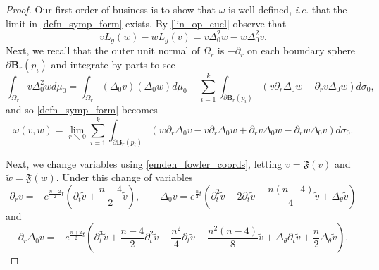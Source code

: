 \documentclass[reqno,11pt]{amsart}
\theoremstyle{tttheorem}
\newcommand{\B}{\mathbf{B}}
\begin{document}
\begin{proof} Our first order of business is to show that 
$\omega$ is well-defined, {\it i.e.} that the limit in \eqref{defn_symp_form}
exists. By \eqref{lin_op_eucl} observe that 
$$vL_g(w) - wL_g(v) = v \Delta_0^2 w - w \Delta_0^2 v.$$
Next, we recall that the outer unit normal of $\Omega_r$ is 
$-\partial_r$ on each boundary sphere $\partial \B_r(p_i)$ 
and integrate by parts to see 
$$\int_{\Omega_r} v\Delta_0^2 w d\mu_0 = \int_{\Omega_r} 
(\Delta_0 v) (\Delta_0 w) d\mu_0 - \sum_{i=1}^k \int_{\partial 
\B_r(p_i)} (v \partial_r \Delta_0 w - \partial_r v \Delta_0 w
)d\sigma_0,$$
and so \eqref{defn_symp_form} becomes 
 \begin{equation} \label{symp_form2} 
 \omega(v,w) = \lim_{r \searrow 0} \sum_{i=1}^k 
 \int_{\partial \B_r(p_i)} (w \partial_r \Delta_0 v - v \partial_r \Delta_0 w
 + \partial_r v \Delta_0 w - \partial_r w \Delta_0 v )d\sigma_0.\end{equation} 

 Next, we change variables using \eqref{emden_fowler_coords}, letting 
 $\widetilde v = \mathfrak{F}(v)$ and $\widetilde w= \mathfrak{F}(w)$. Under this 
 change of variables 
 \begin{equation} \label{transformed_derivatives1} 
 \partial_r v = -e^{ \frac{n-2}{2}t} 
 \left ( \partial_t \widetilde v + \frac{n-4}{2} \widetilde v \right ), 
 \qquad \Delta_0 v = e^{\frac{n}{2}t} \left ( \partial_t^2 \widetilde v - 2 \partial_t 
 \widetilde v -\frac{n(n-4)}{4} \widetilde v + \Delta_\theta \widetilde v \right )
 \end{equation} 
 and 
 \begin{equation} \label{transformed_derivatives2} 
 \partial_r \Delta_0 v = -e^{\frac{n+2}{2}t} \left ( \partial_t^3 
 \widetilde v + \frac{n-4}{2} \partial_t^2 \widetilde v -\frac{n^2}{4} \partial_t \widetilde v
 -\frac{n^2(n-4)}{8} \widetilde v + \Delta_\theta \partial_t \widetilde v + \frac{n}{2} \Delta_\theta 
 \widetilde v \right ).\end{equation} 



\end{proof}
\end{document}
